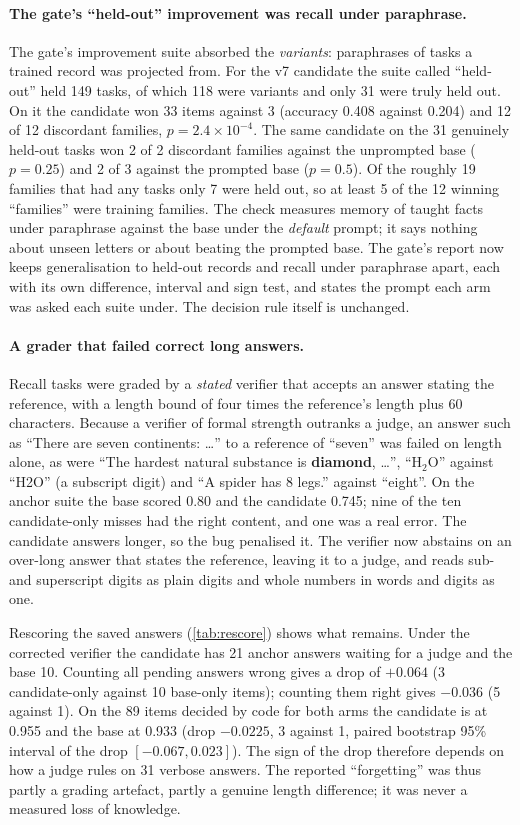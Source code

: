\paragraph{The gate's ``held-out'' improvement was recall under paraphrase.}
The gate's improvement suite absorbed the \emph{variants}: paraphrases of tasks a trained
record was projected from. For the v7 candidate the suite called ``held-out'' held 149
tasks, of which 118 were variants and only 31 were truly held out. On it the candidate won
33 items against 3 (accuracy 0.408 against 0.204) and 12 of 12 discordant families,
$p=2.4\times10^{-4}$. The same candidate on the 31 genuinely held-out tasks won 2 of 2
discordant families against the unprompted base ($p=0.25$) and 2 of 3 against the prompted
base ($p=0.5$). Of the roughly 19 families that had any tasks only 7 were held out, so at
least 5 of the 12 winning ``families'' were training families. The check measures memory of
taught facts under paraphrase against the base under the \emph{default} prompt; it says
nothing about unseen letters or about beating the prompted base. The gate's report now keeps
generalisation to held-out records and recall under paraphrase apart, each with its own
difference, interval and sign test, and states the prompt each arm was asked each suite
under. The decision rule itself is unchanged.

\paragraph{A grader that failed correct long answers.}
Recall tasks were graded by a \emph{stated} verifier that accepts an answer stating the
reference, with a length bound of four times the reference's length plus 60 characters.
Because a verifier of formal strength outranks a judge, an answer such as
``There are seven continents: \ldots'' to a reference of ``seven'' was failed on length alone,
as were ``The hardest natural substance is \textbf{diamond}, \ldots'', ``H$_2$O'' against
``H2O'' (a subscript digit) and ``A spider has 8 legs.'' against ``eight''. On the anchor suite the base scored 0.80 and the candidate 0.745; nine of the
ten candidate-only misses had the right content, and one was a real error. The candidate
answers longer, so the bug penalised it. The verifier now abstains on an over-long answer
that states the reference, leaving it to a judge, and reads sub- and superscript digits as
plain digits and whole numbers in words and digits as one.

Rescoring the saved answers (\cref{tab:rescore}) shows what remains. Under the corrected
verifier the candidate has 21 anchor answers waiting for a judge and the base 10. Counting
all pending answers wrong gives a drop of $+0.064$ (3 candidate-only against 10 base-only
items); counting them right gives $-0.036$ (5 against 1). On the 89 items decided by code for
both arms the candidate is at 0.955 and the base at 0.933 (drop $-0.0225$, 3 against 1, paired
bootstrap 95\% interval of the drop $[-0.067, 0.023]$). The sign of the drop therefore
depends on how a judge rules on 31 verbose answers. The reported ``forgetting'' was
thus partly a grading artefact, partly a genuine length difference; it was never a
measured loss of knowledge.

